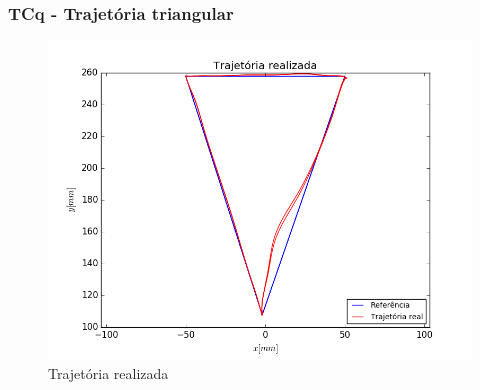 \documentclass[]{politex}
\begin{document}
\subsubsection{TCq - Trajetória triangular}

\begin{figure}[H]
	\centering
	\includegraphics[scale=0.39]{../../../Experimental/Aquisicoes/CTCt_triangulo/xy.png}  
	\caption{Trajetória realizada}
	\label{fig:CTCq_triangulo_xy}
\end{figure}
\end{document}

